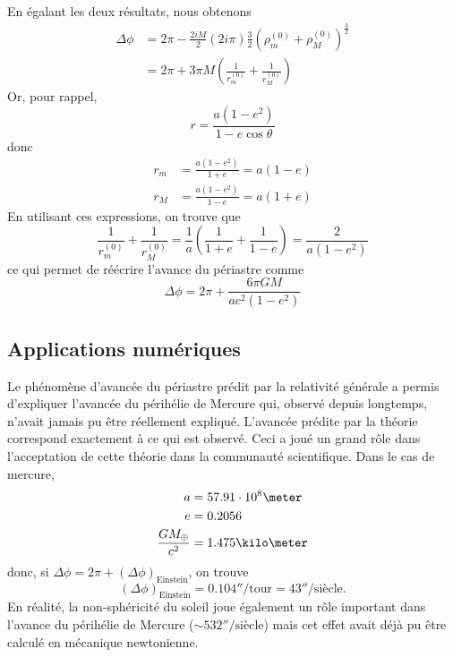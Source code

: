 \documentclass[a4paper,11pt]{report}
\theoremstyle{definition}
\theoremstyle{plain}
\theoremstyle{definition}
\theoremstyle{remark}
\begin{document}
            En égalant les deux résultats, nous obtenons
            \begin{align}
                \Delta\phi &= 2\pi-\frac{2iM}{2}(2i\pi)\frac{3}{2}(\rho^{(0)}_m+\rho^{(0)}_M)^{\frac{3}{2}}\\
                &= 2\pi+3\pi M\left( \frac{1}{r^{(0)}_m}+\frac{1}{r^{(0)}_M} \right)
            \end{align}
            Or, pour rappel,
            \begin{equation}
                r = \frac{a(1-e^2)}{1-e\cos\theta}
            \end{equation}
            donc
            \begin{align}
                r_m &= \frac{a(1-e^2)}{1+e} = a(1-e)\\
                r_M &= \frac{a(1-e^2)}{1-e} = a(1+e)
            \end{align}
            En utilisant ces expressions, on trouve que
            \begin{equation}
                \frac{1}{r^{(0)}_m}+\frac{1}{r^{(0)}_M} = \frac{1}{a}\left( \frac{1}{1+e}+\frac{1}{1-e} \right) = \frac{2}{a(1-e^2)}
            \end{equation}
            ce qui permet de réécrire l'avance du périastre comme
            \begin{equation}
                \boxed{\Delta\phi = 2\pi+\frac{6\pi GM}{ac^2(1-e^2)}}
            \end{equation}
            
        \subsection{Applications numériques}
                
            Le phénomène d'avancée du périastre prédit par la relativité générale a permis d'expliquer l'avancée du périhélie de Mercure qui, observé depuis longtemps, n'avait jamais pu être réellement expliqué. L'avancée prédite par la théorie correspond exactement à ce qui est observé. Ceci a joué un grand rôle dans l'acceptation de cette théorie dans la communauté scientifique. Dans le cas de mercure,
            \begin{align}
                a &= 57.91\cdot10^8\meter\\
                e &= 0.2056\\
                \frac{GM_{\oplus}}{c^2} &= 1.475\kilo\meter
            \end{align}
            donc, si $\Delta\phi = 2\pi+(\Delta\phi)_{\text{Einstein}}$, on trouve
            \begin{equation}
                (\Delta\phi)_{\text{Einstein}} = 0.104''/\text{tour} = 43''/\text{siècle}.
            \end{equation}
            En réalité, la non-sphéricité du soleil joue également un rôle important dans l'avance du périhélie de Mercure ($\sim 532''/\text{siècle}$) mais cet effet avait déjà pu être calculé en mécanique newtonienne.\\
            
\end{document}
